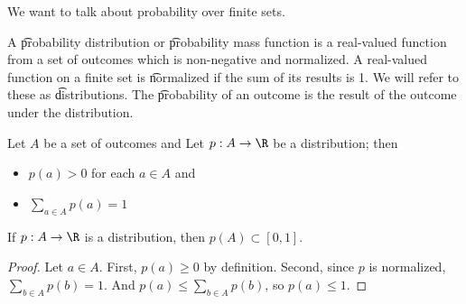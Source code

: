 

We want to talk about probability over finite sets.


A \t{probability distribution} or \t{probability mass function} is a real-valued function from a set of outcomes which is non-negative and normalized.
A real-valued function on a finite set is \t{normalized} if the sum of its results is 1.
We will refer to these as \t{distributions}.
The \t{probability of an outcome} is the result of the outcome under the distribution.


Let $A$ be a set of outcomes and
Let $p: A \to \R$ be a distribution; then

\begin{itemize}

\item $p(a) > 0$ for each $a \in A$ and
\item $\sum_{a \in A} p(a) = 1$

\end{itemize}

\begin{prop}

If $p: A \to \R$ is a distribution, then $p(A) \subset [0, 1]$.

\begin{proof}

Let $a \in A$.
First, $p(a) \geq 0$ by definition.
Second, since $p$ is normalized, $\sum_{b \in A} p(b) = 1$.
And $p(a) \leq \sum_{b \in A} p(b)$, so $p(a) \leq 1$.

\end{proof}

\end{prop}

